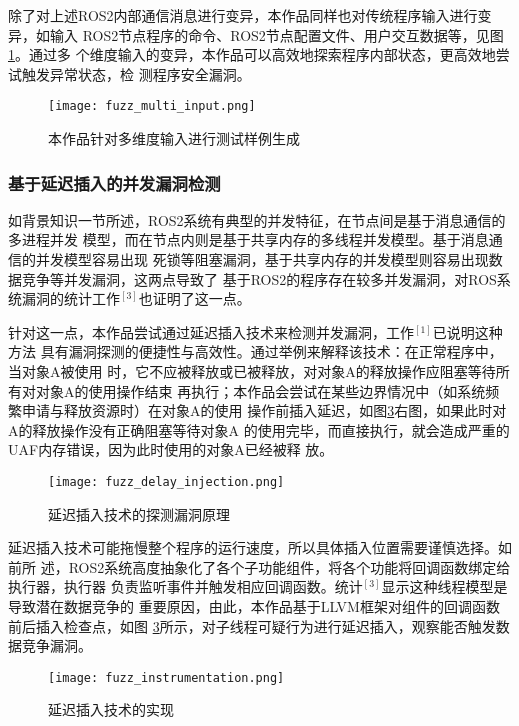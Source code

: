 除了对上述ROS2内部通信消息进行变异，本作品同样也对传统程序输入进行变异，如输入
ROS2节点程序的命令、ROS2节点配置文件、用户交互数据等，见图\ref{pic:fmi}。通过多
个维度输入的变异，本作品可以高效地探索程序内部状态，更高效地尝试触发异常状态，检
测程序安全漏洞。

\begin{figure}[h]
    \centering
    \texttt{[image: fuzz\_multi\_input.png]}
    \caption{本作品针对多维度输入进行测试样例生成}
    \label{pic:fmi}
\end{figure}

\subsubsection{基于延迟插入的并发漏洞检测}

如背景知识一节所述，ROS2系统有典型的并发特征，在节点间是基于消息通信的多进程并发
模型，而在节点内则是基于共享内存的多线程并发模型。基于消息通信的并发模型容易出现
死锁等阻塞漏洞，基于共享内存的并发模型则容易出现数据竞争等并发漏洞，这两点导致了
基于ROS2的程序存在较多并发漏洞，对ROS系统漏洞的统计工作$^{[3]}$也证明了这一点。

针对这一点，本作品尝试通过延迟插入技术来检测并发漏洞，工作$^{[1]}$已说明这种方法
具有漏洞探测的便捷性与高效性。通过举例来解释该技术：在正常程序中，当对象A被使用
时，它不应被释放或已被释放，对对象A的释放操作应阻塞等待所有对对象A的使用操作结束
再执行；本作品会尝试在某些边界情况中（如系统频繁申请与释放资源时）在对象A的使用
操作前插入延迟，如图\ref{pic:fi}右图，如果此时对A的释放操作没有正确阻塞等待对象A
的使用完毕，而直接执行，就会造成严重的UAF内存错误，因为此时使用的对象A已经被释
放。

\begin{figure}[h]
    \centering
    \texttt{[image: fuzz\_delay\_injection.png]}
    \caption{延迟插入技术的探测漏洞原理}
    \label{pic:fdi}
\end{figure}

延迟插入技术可能拖慢整个程序的运行速度，所以具体插入位置需要谨慎选择。如前所
述，ROS2系统高度抽象化了各个子功能组件，将各个功能将回调函数绑定给执行器，执行器
负责监听事件并触发相应回调函数。统计$^{[3]}$显示这种线程模型是导致潜在数据竞争的
重要原因，由此，本作品基于LLVM框架对组件的回调函数前后插入检查点，如图
\ref{pic:fi}所示，对子线程可疑行为进行延迟插入，观察能否触发数据竞争漏洞。

\begin{figure}[h]
    \centering
    \texttt{[image: fuzz\_instrumentation.png]}
    \caption{延迟插入技术的实现}
    \label{pic:fi}
\end{figure}

